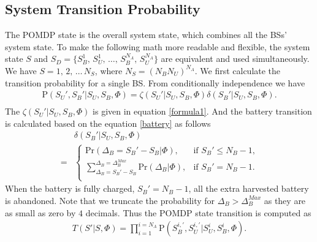 \documentclass[journal,12pt,draftclsnofoot,onecolumn]{IEEEtran}
\begin{document}
\subsection{System Transition Probability}
The POMDP state is the overall system state, which combines all the BSs' system state.
To make the following math more readable and flexible,
the system state \(S\) and \(S_D = \{S_B^1,\,S_U^1,\,\ldots,\,S_B^{N_A},\,S_U^{N_A}\}\)
are equivalent and used simultaneously.
We have \(S = 1,\,2,\, \ldots\,N_S\), where \(N_S = \left(N_BN_U\right)^{N_A}\).
We first calculate the transition probability for a single BS.
From conditionally independence we have
\begin{equation}
\begin{aligned}
	\mbox{P}\left(S_U',S_B'|S_U,S_B,\Phi\right) =
	\zeta\left(S_U'|S_U, S_B, \Phi\right) \delta\left(S_B'|S_U, S_B, \Phi\right).\\
\end{aligned}
\end{equation}
The \(\zeta\left(S_U'|S_U, S_B, \Phi\right)\) is given in equation \eqref{formula1}.
And the battery transition is calculated based on the equation \eqref{battery} as follows
\begin{align}
	&\delta\left(S_B'|S_U, S_B, \Phi\right)\nonumber\\
	= &
	\begin{cases}
		\mbox{Pr}\left(\Delta_B = S_B' - S_B|\Phi \right), &\mbox{if $S_B' \le N_B - 1$,}\\
		\sum_{\Delta_B = S_B' - S_B}^{\Delta_B = \Delta_B^{Max}}\mbox{Pr}\left(\Delta_B|\Phi\right),
		&\mbox{if $S_B' = N_B - 1$.}\\
\end{cases}
\end{align}
When the battery is fully charged, \(S_B'=N_B - 1\), all the extra harvested battery is abandoned.
Note that we truncate the probability for \(\Delta_B >\Delta_B^{Max}\) as they are as small as zero by \(4\) decimals.
Thus the POMDP state transition is computed as
\begin{align}\label{transition}
	T\left(S'|S,\Phi\right) = \prod_{i = 1}^{i = N_A}\mbox{P}\left(S_B^{i,'}, S_U^{i,'}|S_U^i, S_B^i, \Phi\right).
\end{align}
\end{document}

